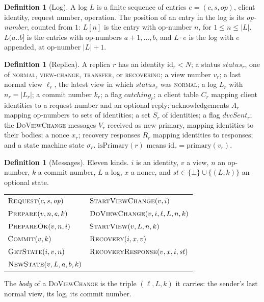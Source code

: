 \documentclass[11pt,a4paper]{article}
\theoremstyle{plain}
\theoremstyle{definition}
\newtheorem{definition}[theorem]{Definition}
\theoremstyle{remark}
\newcommand{\msg}[1]{\textsc{#1}}
\newcommand{\dvc}{\msg{DoViewChange}}
\newcommand{\primary}{\mathrm{primary}}
\newcommand{\status}{\mathit{status}}
\newcommand{\normal}{\textsc{normal}}
\newcommand{\viewchange}{\textsc{view-change}}
\newcommand{\transfer}{\textsc{transfer}}
\newcommand{\recovering}{\textsc{recovering}}
\begin{document}
\begin{definition}[Log]
A log $L$ is a finite sequence of entries $e = (c, s, \mathit{op})$,
client identity, request number, operation. The position of an entry in
the log is its \emph{op-number}, counted from $1$: $L[n]$ is the entry
with op-number $n$, for $1 \le n \le |L|$. $L(a{..}b]$ is the entries
with op-numbers $a+1, \dots, b$, and $L \cdot e$ is the log with $e$
appended, at op-number $|L|+1$.
\end{definition}

\begin{definition}[Replica]
\label{def:replica}
A replica $r$ has an identity $\mathrm{id}_r < N$; a status
$\status_r$, one of \normal, \viewchange, \transfer, or \recovering; a view
number $v_r$; a last normal view $\ell_r$, the latest view in which
$\status_r$ was \normal; a log $L_r$ with $n_r = |L_r|$; a commit number
$k_r$; a flag $\mathit{catching}_r$; a client table $C_r$ mapping client
identities to a request number and an optional reply; acknowledgements
$A_r$ mapping op-numbers to sets of identities; a set $S_r$ of
identities; a flag $\mathit{dvcSent}_r$; the \dvc{} messages $V_r$
received as new primary, mapping identities to their bodies; a nonce
$x_r$; recovery responses $R_r$ mapping identities to
responses; and a state machine state $\sigma_r$.
$\mathrm{isPrimary}(r)$ means $\mathrm{id}_r = \primary(v_r)$.
\end{definition}

\begin{definition}[Messages]
\label{def:messages}
Eleven kinds. $i$ is an identity, $v$ a view, $n$ an op-number, $k$ a
commit number, $L$ a log, $x$ a nonce, and $\mathit{st} \in \{\bot\} \cup
\{(L, k)\}$ an optional state.
\begin{center}
\small
\begin{tabular}{@{}ll@{}}
$\msg{Request}(c, s, \mathit{op})$ & $\msg{StartViewChange}(v, i)$ \\
$\msg{Prepare}(v, n, e, k)$ & $\msg{DoViewChange}(v, i, \ell, L, n, k)$ \\
$\msg{PrepareOk}(v, n, i)$ & $\msg{StartView}(v, L, n, k)$ \\
$\msg{Commit}(v, k)$ & $\msg{Recovery}(i, x, v)$ \\
$\msg{GetState}(i, v, n)$ & $\msg{RecoveryResponse}(v, x, i, \mathit{st})$ \\
$\msg{NewState}(v, L, a, b, k)$ &
\end{tabular}
\end{center}
The \emph{body} of a \dvc{} is the triple $(\ell, L, k)$ it carries:
the sender's last normal view, its log, its commit number.
\end{definition}
\end{document}
